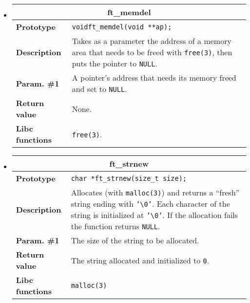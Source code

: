\documentclass{42-en}
\begin{document}
\begin{itemize}
            \item \begin{tabular}{|l|p{11cm}|}
                \hline
                \multicolumn{2}{|c|}{\textbf{ft\_memdel}}\\
                \hline
                \textbf{Prototype} &
                \texttt{void\hspace{5mm}ft\_memdel(void **ap);}\\
                \hline
                \textbf{Description} & Takes as a parameter the address
                of a memory area that needs to be freed with \texttt{free(3)},
                then puts the pointer to \texttt{NULL}.\\
                \hline
                \textbf{Param. \#1} & A pointer's address that needs
                its memory freed and set to \texttt{NULL}.\\
                \hline
                \textbf{Return value} & None.\\
                \hline
                \textbf{Libc functions} & \texttt{free(3)}.\\
                \hline
            \end{tabular}

            \item \begin{tabular}{|l|p{11cm}|}
                \hline
                \multicolumn{2}{|c|}{\textbf{ft\_strnew}}\\
                \hline
                \textbf{Prototype} & \texttt{char
                  *\hspace{5mm}ft\_strnew(size\_t size);}\\
                \hline
                \textbf{Description} & Allocates (with
                \texttt{malloc(3)}) and returns a ``fresh'' string ending
                with \texttt{'\textbackslash{}0'}. Each character of the
                string is initialized at \texttt{'\textbackslash{}0'}.
                If the allocation fails the function returns \texttt{NULL}.\\
                \hline
                \textbf{Param. \#1} & The size of the string to be
                allocated.\\
                \hline
                \textbf{Return value} & The string allocated and initialized
                to \texttt{0}.\\
                \hline
                \textbf{Libc functions} & \texttt{malloc(3)}\\
                \hline
            \end{tabular}


\end{itemize}
\end{document}
